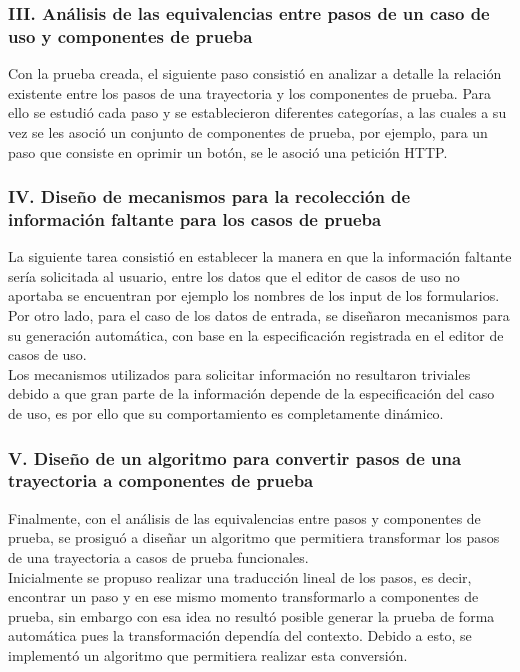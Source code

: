 \subsubsection*{III. Análisis de las equivalencias entre pasos de un caso de uso y componentes de  prueba}

	Con la prueba creada, el siguiente paso consistió en analizar a detalle la relación existente entre los pasos de una trayectoria y los componentes de prueba. Para ello se estudió cada paso y se establecieron diferentes categorías, a las cuales a su vez se les asoció un conjunto de componentes de prueba, por ejemplo, para un paso que consiste en oprimir un botón, se le asoció una petición HTTP.
	
	
	\subsubsection*{IV. Diseño de mecanismos para la recolección de información faltante para los casos de prueba}

	La siguiente tarea consistió en establecer la manera en que la información faltante sería solicitada al usuario, entre los datos que el editor de casos de uso no aportaba se encuentran por ejemplo los nombres de los input de los formularios.\\
	
	 Por otro lado, para el caso de los datos de entrada, se diseñaron mecanismos para su generación automática, con base en la especificación registrada en el editor de casos de uso.\\
	
	 Los mecanismos utilizados para solicitar información no resultaron triviales debido a que gran parte de la información depende de la especificación del caso de uso, es por ello que su comportamiento es completamente dinámico.
	

	\subsubsection*{V. Diseño de un algoritmo para convertir pasos de una trayectoria a componentes de prueba}
	
	Finalmente, con el análisis de las equivalencias entre pasos y componentes de prueba, se prosiguó a diseñar un algoritmo que permitiera transformar los pasos de una trayectoria a casos de prueba funcionales.\\
	
	Inicialmente se propuso realizar una traducción lineal de los pasos, es decir, encontrar un paso y en ese mismo momento transformarlo a componentes de prueba, sin embargo con esa idea no resultó posible generar la prueba de forma automática pues la transformación dependía del contexto. Debido a esto, se implementó un algoritmo que permitiera realizar esta conversión. 
	